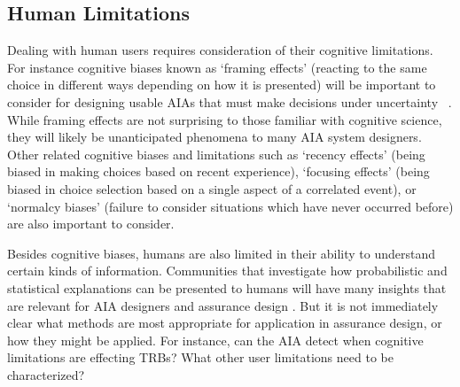 \subsection{Human Limitations}
Dealing with human users requires consideration of their cognitive limitations. For instance cognitive biases known as `framing effects' (reacting to the same choice in different ways depending on how it is presented) will be important to consider for designing usable AIAs that must make decisions under uncertainty ~\cite{Freedy2007-sg,Riley1996-qm}. While framing effects are not surprising to those familiar with cognitive science, they will likely be unanticipated phenomena to many AIA system designers. Other related cognitive biases and limitations such as `recency effects' (being biased in making choices based on recent experience), `focusing effects' (being biased in choice selection based on a single aspect of a correlated event), or `normalcy biases' (failure to consider situations which have never occurred before) are also important to consider. 

Besides cognitive biases, humans are also limited in their ability to understand certain kinds of information. Communities that investigate how probabilistic and statistical explanations can be presented to humans will have many insights that are relevant for AIA designers and assurance design \cite{Rouse1986-dz,Wallace2001-fm,Kuhn1997-qc,Lomas2012-ie,Swartout1983-ko}. But it is not immediately clear what methods are most appropriate for application in assurance design, or how they might be applied. For instance, can the AIA detect when cognitive limitations are effecting TRBs? What other user limitations need to be characterized? 



